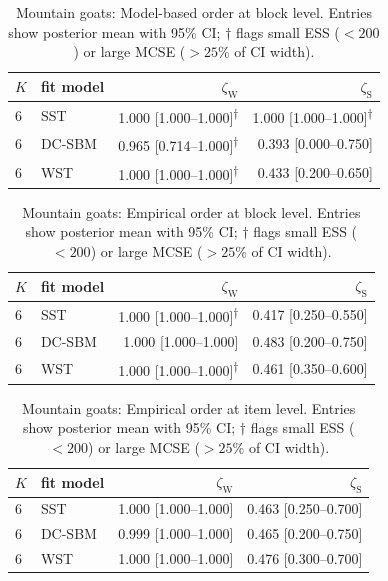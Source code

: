 \begin{table}[htpb]
\centering
\caption{Mountain goats: Model-based order at block level. Entries show posterior mean with 95\% CI; $\dagger$ flags small ESS ($<200$) or large MCSE ($>25\%$ of CI width).}
\label{tab:mountain_goats-model-block}
\begin{tabular}[t]{l l r r}
\toprule
$K$ & fit model & $\zeta_{\mathrm{W}}$ & $\zeta_{\mathrm{S}}$ \\
\midrule
6 & SST & 1.000 [1.000--1.000]\textsuperscript{$\dagger$} & 1.000 [1.000--1.000]\textsuperscript{$\dagger$} \\
6 & DC-SBM & 0.965 [0.714--1.000]\textsuperscript{$\dagger$} & 0.393 [0.000--0.750] \\
6 & WST & 1.000 [1.000--1.000]\textsuperscript{$\dagger$} & 0.433 [0.200--0.650] \\
\bottomrule
\end{tabular}
\end{table}


\begin{table}[htpb]
\centering
\caption{Mountain goats: Empirical order at block level. Entries show posterior mean with 95\% CI; $\dagger$ flags small ESS ($<200$) or large MCSE ($>25\%$ of CI width).}
\label{tab:mountain_goats-emp-block}
\begin{tabular}[t]{l l r r}
\toprule
$K$ & fit model & $\zeta_{\mathrm{W}}$ & $\zeta_{\mathrm{S}}$ \\
\midrule
6 & SST & 1.000 [1.000--1.000]\textsuperscript{$\dagger$} & 0.417 [0.250--0.550] \\
6 & DC-SBM & 1.000 [1.000--1.000] & 0.483 [0.200--0.750] \\
6 & WST & 1.000 [1.000--1.000]\textsuperscript{$\dagger$} & 0.461 [0.350--0.600] \\
\bottomrule
\end{tabular}
\end{table}


\begin{table}[htpb]
\centering
\caption{Mountain goats: Empirical order at item level. Entries show posterior mean with 95\% CI; $\dagger$ flags small ESS ($<200$) or large MCSE ($>25\%$ of CI width).}
\label{tab:mountain_goats-emp-item}
\begin{tabular}[t]{l l r r}
\toprule
$K$ & fit model & $\zeta_{\mathrm{W}}$ & $\zeta_{\mathrm{S}}$ \\
\midrule
6 & SST & 1.000 [1.000--1.000] & 0.463 [0.250--0.700] \\
6 & DC-SBM & 0.999 [1.000--1.000] & 0.465 [0.200--0.750] \\
6 & WST & 1.000 [1.000--1.000] & 0.476 [0.300--0.700] \\
\bottomrule
\end{tabular}
\end{table}


